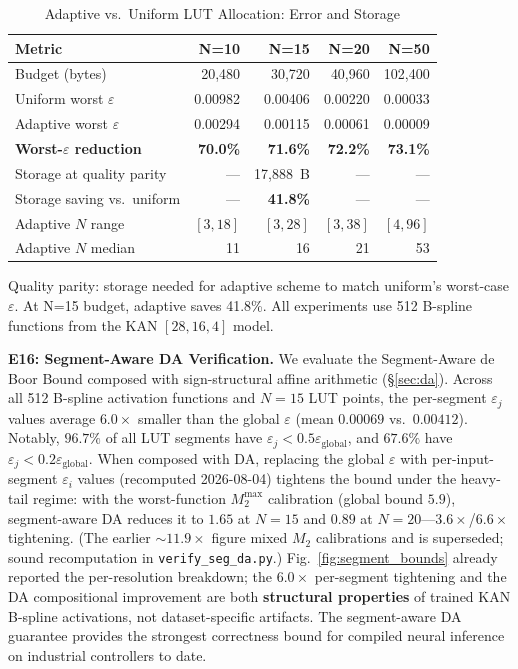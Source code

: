 \documentclass[journal,onecolumn]{IEEEtran}
\begin{document}
\begin{table}[t]
\centering
\caption{Adaptive vs.\ Uniform LUT Allocation: Error and Storage}
\label{tab:adaptive_lut}
\footnotesize
\begin{tabular}{@{}p{1.8cm}rrrr@{}}
\toprule
\textbf{Metric} & \textbf{N=10} & \textbf{N=15} & \textbf{N=20} & \textbf{N=50} \\
\midrule
Budget (bytes) & 20,480 & 30,720 & 40,960 & 102,400 \\
\midrule
Uniform worst $\varepsilon$ & 0.00982 & 0.00406 & 0.00220 & 0.00033 \\
Adaptive worst $\varepsilon$ & 0.00294 & 0.00115 & 0.00061 & 0.00009 \\
\textbf{Worst-$\varepsilon$ reduction} & \textbf{70.0\%} & \textbf{71.6\%} & \textbf{72.2\%} & \textbf{73.1\%} \\
\midrule
Storage at quality parity & --- & 17,888~B & --- & --- \\
Storage saving vs.\ uniform & --- & \textbf{41.8\%} & --- & --- \\
\midrule
Adaptive $N$ range & $[3,18]$ & $[3,28]$ & $[3,38]$ & $[4,96]$ \\
Adaptive $N$ median & 11 & 16 & 21 & 53 \\
\bottomrule
\end{tabular}
\vspace{1pt}
{\scriptsize Quality parity: storage needed for adaptive scheme to match uniform's
worst-case $\varepsilon$. At N=15 budget, adaptive saves 41.8\%.
All experiments use 512 B-spline functions from the KAN $[28,16,4]$ model.}
\end{table}

\noindent\textbf{E16: Segment-Aware DA Verification.}
We evaluate the Segment-Aware de Boor Bound composed with sign-structural affine arithmetic
({\S}\ref{sec:da}). Across all 512 B-spline activation functions and $N=15$ LUT
points, the per-segment $\varepsilon_j$ values average $6.0\times$ smaller
than the global $\varepsilon$ (mean $0.00069$ vs.\ $0.00412$). Notably,
$96.7\%$ of all LUT segments have $\varepsilon_j < 0.5\varepsilon_{\text{global}}$,
and $67.6\%$ have $\varepsilon_j < 0.2\varepsilon_{\text{global}}$.
When composed with DA, replacing the global $\varepsilon$ with per-input-segment
$\varepsilon_i$ values (recomputed 2026-08-04) tightens the bound under the
heavy-tail regime: with the worst-function $M_2^{\max}$ calibration
(global bound $5.9$), segment-aware DA reduces it to $1.65$ at $N=15$ and
$0.89$ at $N=20$---$3.6\times$/$6.6\times$ tightening. (The earlier
$\sim 11.9\times$ figure mixed $M_2$ calibrations and is superseded;
sound recomputation in \texttt{verify\_seg\_da.py}.)
Fig.~\ref{fig:segment_bounds} already reported the per-resolution breakdown;
the $6.0\times$ per-segment tightening and the DA compositional
improvement are both \textbf{structural properties} of trained KAN B-spline
activations, not dataset-specific artifacts. The segment-aware DA guarantee
provides the strongest correctness bound for compiled neural
inference on industrial controllers to date.
\end{document}
